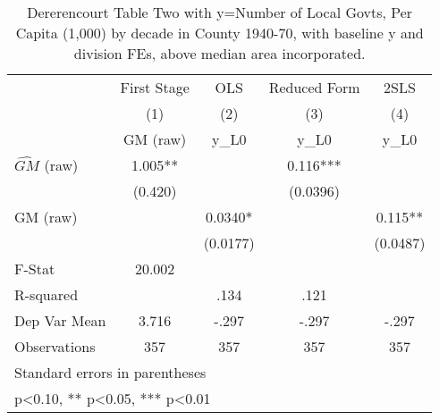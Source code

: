 \begin{table}[htbp]\centering
\def\sym#1{\ifmmode^{#1}\else\(^{#1}\)\fi}
\caption{Dererencourt Table Two with y=Number of Local Govts, Per Capita (1,000) by decade in County 1940-70, with baseline y and division FEs, above median area incorporated.}
\begin{tabular}{l*{4}{c}}
\toprule
                    & First Stage   &         OLS   &Reduced Form   &        2SLS   \\
                    &\multicolumn{1}{c}{(1)}&\multicolumn{1}{c}{(2)}&\multicolumn{1}{c}{(3)}&\multicolumn{1}{c}{(4)}\\
                    &\multicolumn{1}{c}{GM  (raw)}&\multicolumn{1}{c}{y\_L0}&\multicolumn{1}{c}{y\_L0}&\multicolumn{1}{c}{y\_L0}\\
\midrule
$\hat{GM}$ (raw)    &       1.005** &               &       0.116***&               \\
                    &     (0.420)   &               &    (0.0396)   &               \\
\addlinespace
GM  (raw)           &               &      0.0340*  &               &       0.115** \\
                    &               &    (0.0177)   &               &    (0.0487)   \\
\midrule
F-Stat              &      20.002   &               &               &               \\
R-squared           &               &        .134   &        .121   &               \\
Dep Var Mean        &       3.716   &       -.297   &       -.297   &       -.297   \\
Observations        &         357   &         357   &         357   &         357   \\
\bottomrule
\multicolumn{5}{l}{\footnotesize Standard errors in parentheses}\\
\multicolumn{5}{l}{\footnotesize * p<0.10, ** p<0.05, *** p<0.01}\\
\end{tabular}
\end{table}
